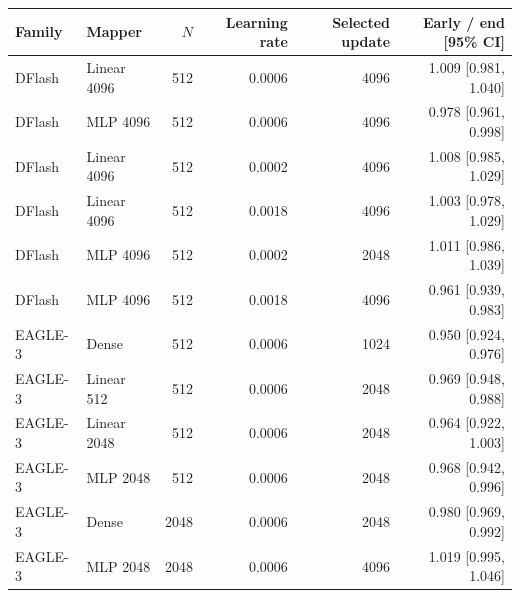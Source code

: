 \begin{tabular}{llrrrr}
\toprule
Family & Mapper & $N$ & Learning rate & Selected update & Early / end [95\% CI] \\
\midrule
DFlash & Linear 4096 & 512 & 0.0006 & 4096 & 1.009 [0.981, 1.040] \\
DFlash & MLP 4096 & 512 & 0.0006 & 4096 & 0.978 [0.961, 0.998] \\
DFlash & Linear 4096 & 512 & 0.0002 & 4096 & 1.008 [0.985, 1.029] \\
DFlash & Linear 4096 & 512 & 0.0018 & 4096 & 1.003 [0.978, 1.029] \\
DFlash & MLP 4096 & 512 & 0.0002 & 2048 & 1.011 [0.986, 1.039] \\
DFlash & MLP 4096 & 512 & 0.0018 & 4096 & 0.961 [0.939, 0.983] \\
\midrule
EAGLE-3 & Dense & 512 & 0.0006 & 1024 & 0.950 [0.924, 0.976] \\
EAGLE-3 & Linear 512 & 512 & 0.0006 & 2048 & 0.969 [0.948, 0.988] \\
EAGLE-3 & Linear 2048 & 512 & 0.0006 & 2048 & 0.964 [0.922, 1.003] \\
EAGLE-3 & MLP 2048 & 512 & 0.0006 & 2048 & 0.968 [0.942, 0.996] \\
EAGLE-3 & Dense & 2048 & 0.0006 & 2048 & 0.980 [0.969, 0.992] \\
EAGLE-3 & MLP 2048 & 2048 & 0.0006 & 4096 & 1.019 [0.995, 1.046] \\
\bottomrule
\end{tabular}
